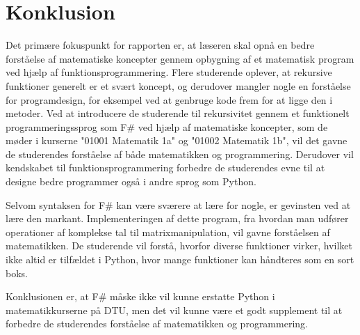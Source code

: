 \section{Konklusion}

Det primære fokuspunkt for rapporten er, at læseren skal opnå en bedre forståelse af matematiske koncepter gennem opbygning af et matematisk program ved hjælp af funktionsprogrammering. Flere studerende oplever, at rekursive funktioner generelt er et svært koncept, og derudover mangler nogle en forståelse for programdesign, for eksempel ved at genbruge kode frem for at ligge den i metoder. Ved at introducere de studerende til rekursivitet gennem et funktionelt programmeringssprog som F\# ved hjælp af matematiske koncepter, som de møder i kurserne "01001 Matematik 1a" og "01002 Matematik 1b", vil det gavne de studerendes forståelse af både matematikken og programmering. Derudover vil kendskabet til funktionsprogrammering forbedre de studerendes evne til at designe bedre programmer også i andre sprog som Python.

Selvom syntaksen for F\# kan være sværere at lære for nogle, er gevinsten ved at lære den markant. Implementeringen af dette program, fra hvordan man udfører operationer af komplekse tal til matrixmanipulation, vil gavne forståelsen af matematikken. De studerende vil forstå, hvorfor diverse funktioner virker, hvilket ikke altid er tilfældet i Python, hvor mange funktioner kan håndteres som en sort boks.

Konklusionen er, at F\# måske ikke vil kunne erstatte Python i matematikkurserne på DTU, men det vil kunne være et godt supplement til at forbedre de studerendes forståelse af matematikken og programmering.
